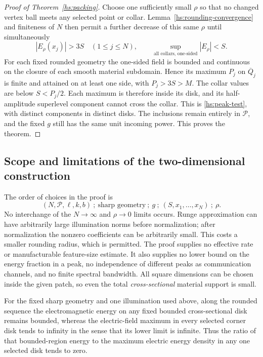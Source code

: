 \begin{proof}[Proof of Theorem~\ref{hs:packing}]
Choose one sufficiently small $\rho$ so that no changed vertex
ball meets any selected point or collar.  Lemma~\ref{hs:rounding-convergence}
and finiteness of $N$ then permit a further decrease of this same
$\rho$ until simultaneously
\begin{equation}
 |E_\rho(x_j)|>3S\quad(1\leq j\leq N),
 \qquad
 \sup_{\text{all collars, one-sided}}|E_\rho|<S.
 \label{hs:rounded-values}
\end{equation}
For each fixed rounded geometry the one-sided field is bounded and
continuous on the closure of each smooth material subdomain.
Hence its maximum $P_j$ on $\overline Q_j$ is finite and attained
on at least one side, with $P_j>3S>M$.
The collar values are below $S<P_j/2$.  Each maximum is therefore
inside its disk, and its half-amplitude superlevel component cannot
cross the collar.  This is \eqref{hs:peak-test}, with distinct
components in distinct disks.  The inclusions remain entirely in
$\mathcal P$, and the fixed $g$ still has the same unit incoming
power.  This proves the theorem.
\end{proof}

\subsection{Scope and limitations of the two-dimensional construction}
\label{hs:limits}

The order of choices in the proof is
\begin{equation}
 (N,\mathcal P,\ell,k,b)\ ;\ \text{sharp geometry}\ ;\ g\ ;\
 (S,x_1,\ldots,x_N)\ ;\ \rho.
 \label{hs:order-of-limits}
\end{equation}
No interchange of the $N\to\infty$ and $\rho\to0$ limits occurs.
Runge approximation can have arbitrarily large illumination norms
before normalization; after normalization the nonzero coefficients
can be arbitrarily small.  This costs a smaller rounding radius,
which is permitted.  The proof supplies no effective rate or
manufacturable feature-size estimate.  It also supplies no lower
bound on the energy fraction in a peak, no independence of different
peaks as communication channels, and no finite spectral bandwidth.
All square dimensions can be chosen inside the given patch, so even
the total \emph{cross-sectional} material support is small.

\begin{proposition}
\label{hs:regional-ratio}
For the fixed sharp geometry and one illumination used above, along
the rounded sequence the electromagnetic energy on any fixed bounded
cross-sectional disk remains bounded, whereas the electric-field
maximum in every selected corner disk tends to infinity in the
sense that its lower limit is infinite.  Thus the ratio of that
bounded-region energy to the maximum electric energy density in
any one selected disk tends to zero.
\end{proposition}

